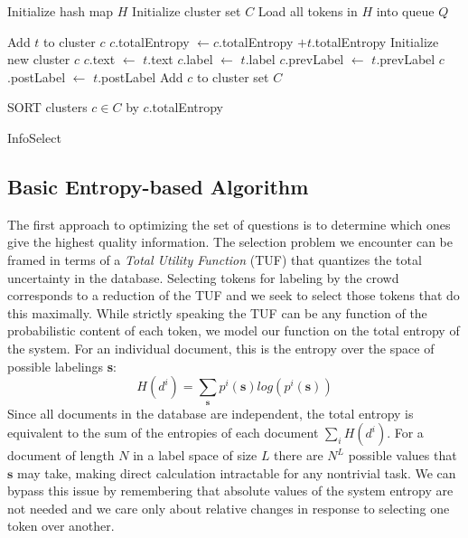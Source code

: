 \begin{algorithm}[fillcomment]
\label{alg:infoselect}
\BlankLine
Initialize hash map $H$\;
Initialize cluster set $C$\;
\;
\;
Load all tokens in $H$ into queue $Q$\;
{
	{
			{
				Add $t$ to cluster $c$\;
				$c$.totalEntropy $\leftarrow c$.totalEntropy $+ t$.totalEntropy\;
			}
	}
	{
		Initialize new cluster $c$\;
		$c$.text $\leftarrow$ $t$.text\;
		$c$.label $\leftarrow$ $t$.label\;
		$c$.prevLabel $\leftarrow$ $t$.prevLabel\;
		$c$.postLabel $\leftarrow$ $t$.postLabel\;
		Add $c$ to cluster set $C$\;
	}
	
}
SORT clusters $c \in C$ by $c$.totalEntropy\;

\caption{InfoSelect}
\end{algorithm}

\subsection{Basic Entropy-based Algorithm}

The first approach to optimizing the set of questions is to determine which ones give the highest quality information.  The selection problem we encounter can be framed in terms of a \textit{Total Utility Function} (TUF) that quantizes the total uncertainty in the database.  Selecting tokens for labeling by the crowd corresponds to a reduction of the TUF and we seek to select those tokens that do this maximally.  While strictly speaking the TUF can be any function of the probabilistic content of each token, we model our function on the total entropy of the system.  For an individual document, this is the entropy over the space of possible labelings \textbf{s}:
\begin{equation}
H(d^{i}) = \sum_{\textbf{s}}p^{i}(\textbf{s})log(p^{i}(\textbf{s}))
\end{equation}
Since all documents in the database are independent, the total entropy is equivalent to the sum of the entropies of each document $\sum_{i}H(d^{i})$.  For a document of length $N$ in a label space of size $L$ there are $N^{L}$ possible values that $\textbf{s}$ may take, making direct calculation intractable for any nontrivial task.  We can bypass this issue by remembering that absolute values of the system entropy are not needed and we care only about relative changes in response to selecting one token over another.  

